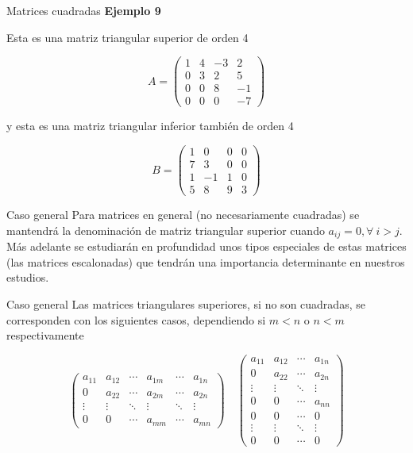 \documentclass[
  ignorenonframetext,
]{beamer}
\begin{document}
\begin{frame}{Matrices cuadradas}
\protect\hypertarget{matrices-cuadradas-6}{}
\textbf{Ejemplo 9}

Esta es una matriz triangular superior de orden 4

\[A = \begin{pmatrix}1&4&-3&2\\0&3&2&5\\0&0&8&-1\\0&0&0&-7\end{pmatrix}\]

y esta es una matriz triangular inferior también de orden 4

\[B = \begin{pmatrix}1&0&0&0\\7&3&0&0\\1&-1&1&0\\5&8&9&3\end{pmatrix}\]
\end{frame}

\begin{frame}{Caso general}
\protect\hypertarget{caso-general}{}
Para matrices en general (no necesariamente cuadradas) se mantendrá la
denominación de matriz triangular superior cuando
\(a_{ij}=0,\forall\ i>j\). Más adelante se estudiarán en profundidad
unos tipos especiales de estas matrices (las matrices escalonadas) que
tendrán una importancia determinante en nuestros estudios.
\end{frame}

\begin{frame}{Caso general}
\protect\hypertarget{caso-general-1}{}
Las matrices triangulares superiores, si no son cuadradas, se
corresponden con los siguientes casos, dependiendo si \(m<n\) o \(n<m\)
respectivamente

\[\begin{pmatrix}a_{11}&a_{12}&\cdots&a_{1m}&\cdots&a_{1n}\\0&a_{22}&\cdots&a_{2m}&\cdots&a_{2n}\\\vdots & \vdots & \ddots& \vdots&\ddots&\vdots\\0&0&\cdots&a_{mm}&\cdots&a_{mn}\end{pmatrix}\quad \begin{pmatrix}a_{11}&a_{12}&\cdots&a_{1n}\\0&a_{22}&\cdots&a_{2n}\\\vdots & \vdots & \ddots& \vdots\\0&0&\cdots&a_{nn}\\0&0&\cdots&0\\\vdots&\vdots&\ddots&\vdots\\0&0&\cdots&0\end{pmatrix}\]
\end{frame}
\end{document}
